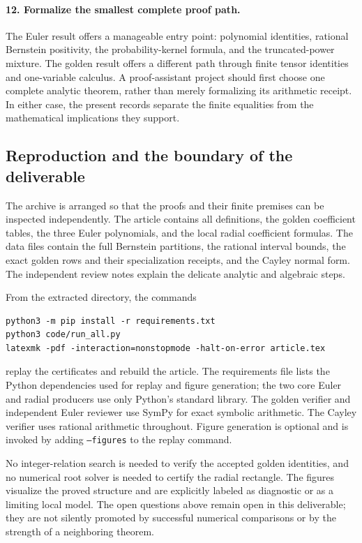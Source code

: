 \paragraph{12. Formalize the smallest complete proof path.}
The Euler result offers a manageable entry point: polynomial
identities, rational Bernstein positivity, the probability-kernel
formula, and the truncated-power mixture. The golden result offers a
different path through finite tensor identities and one-variable
calculus. A proof-assistant project should first choose one complete
analytic theorem, rather than merely formalizing its arithmetic
receipt. In either case, the present records separate the finite
equalities from the mathematical implications they support.

\subsection{Reproduction and the boundary of the deliverable}

The archive is arranged so that the proofs and their finite premises
can be inspected independently. The article contains all definitions,
the golden coefficient tables, the three Euler polynomials, and the
local radial coefficient formulas. The data files contain the full
Bernstein partitions, the rational interval bounds, the exact golden
rows and their specialization receipts, and the Cayley normal form.
The independent review notes explain the delicate analytic and
algebraic steps.

From the extracted directory, the commands
\begin{verbatim}
python3 -m pip install -r requirements.txt
python3 code/run_all.py
latexmk -pdf -interaction=nonstopmode -halt-on-error article.tex
\end{verbatim}
replay the certificates and rebuild the article. The requirements file
lists the Python dependencies used for replay and figure generation;
the two core Euler and radial producers use only Python's standard
library. The golden verifier and independent Euler reviewer use SymPy
for exact symbolic arithmetic. The Cayley verifier uses rational
arithmetic throughout. Figure generation is optional and is invoked
by adding \texttt{--figures} to the replay command.

No integer-relation search is needed to verify the accepted golden
identities, and no numerical root solver is needed to certify the
radial rectangle. The figures visualize the proved structure and are
explicitly labeled as diagnostic or as a limiting local model. The
open questions above remain open in this deliverable; they are not
silently promoted by successful numerical comparisons or by the
strength of a neighboring theorem.
